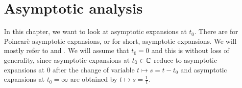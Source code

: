 \chapter{Asymptotic analysis}
\begin{comment}
  \begin{multicols}{2}
    ´classical'
    \begin{itemize}
      \item \cite[60]{sabbah_cimpa90} Chapter II.2.2
        \begin{itemize}
          \item \cite{sabbah2000equations}
        \end{itemize}
      \item \textbf{\textcolor{blue}{Van der Put:
            \cite[Chapter 7]{van2003galois}: Exact Asymptotics}}
      \item \cite{majima1984asymptotic}
      \item \cite[Sec.4.4]{Balser2000Formal}
      \item \cite{Loday1994}
      \item \textbf{\textcolor{blue}{\cite{Loday2014} Chapter 2}}
    \end{itemize}
    \columnbreak
    ´sheafical'
    \begin{itemize}
      \item \textbf{\textcolor{red}{\cite[II.5]{sabbah2007isomonodromic}}}
    \end{itemize}
  \end{multicols}
  \TODO[\cite{sibuya1990Linear} Appendix A.3]
\end{comment}
In this chapter, we want to look at asymptotic expansions at $t_0$.
There are  for Poincarè asymptotic
expansions, or for short, asymptotic expansions.
We will mostly refer to \cite[chapter 2]{Loday2014} and
\cite[chapter 7]{van2003galois}.
We will assume that $t_0=0$ and this is without loss of generality, since
asymptotic expansions at $t_0\in\mathbb{C}$ reduce to asymptotic expansions at $0$
after the change of variable $t\mapsto s=t-t_0$ and asymptotic expansions at
$t_0=\infty$ are obtained by $t\mapsto s=\frac{1}{t}$.

